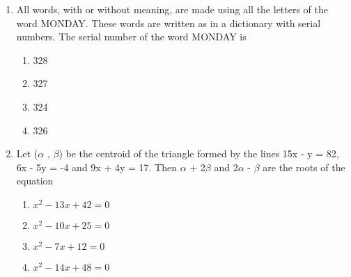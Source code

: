 \documentclass[journal]{IEEEtran}
\numberwithin{equation}{enumi}
\numberwithin{figure}{enumi}
\begin{document}
\begin{enumerate}
    \begin{multicols}{4}
    \begin{enumerate}
        \item 6
        \item 7
        \item 9
        \item 8
    \end{enumerate}
    \end{multicols}
    \bigskip
    \item All words, with or without meaning, are made using all the letters of the word MONDAY. These words are written as in a dictionary with serial numbers. The serial number of the word MONDAY is \\
    \begin{multicols}{4}
    \begin{enumerate}
        \item 328
        \item 327
        \item 324
        \item 326
    \end{enumerate} 
    \end{multicols}
    \bigskip
    \item  Let ($\alpha$ , $\beta$) be the centroid of the triangle formed by the lines 15x - y = 82, \\6x - 5y = -4 and 9x + 4y = 17. Then $\alpha$ + 2$\beta$ and 2$\alpha$ - $\beta$ are the roots of the equation \\
    \begin{multicols}{4}
    \begin{enumerate}
        \item $x^2 - 13x + 42 = 0$
        \item $x^2 - 10x + 25 = 0$
        \item $x^2 - 7x + 12 = 0$
        \item $x^2 - 14x + 48 = 0$
    \end{enumerate} 
    \end{multicols}
    \bigskip
\end{enumerate}
\end{document}
